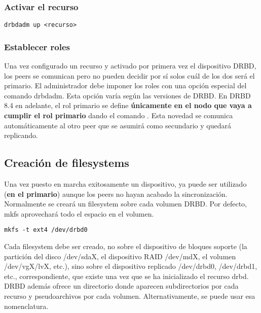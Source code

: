 \subsubsection{Activar el recurso}
\begin{lstlisting}
drbdadm up <recurso>
\end{lstlisting}

\subsubsection{Establecer roles}
Una vez configurado un recurso y activado por primera vez el dispositivo DRBD, los peers se comunican pero no pueden decidir por sí solos  cuál de los dos será el primario. El administrador debe imponer los roles con una opción especial del comando drbdadm. Esta opción varía según las versiones de DRBD. 
En DRBD 8.4 en adelante, el rol primario se define \textbf{únicamente en el nodo que vaya a cumplir el rol primario} dando el comando . Esta novedad se comunica automáticamente al otro peer que se asumirá como secundario y quedará replicando.



\subsection{Creación de filesystems}
Una vez puesto en marcha exitosamente un dispositivo, ya puede ser utilizado (\textbf{en el primario}) aunque los peers no hayan acabado la sincronización. Normalmente se creará un filesystem sobre cada volumen DRBD. Por defecto, mkfs aprovechará todo el espacio en el volumen. 

\begin{lstlisting}
mkfs -t ext4 /dev/drbd0
\end{lstlisting}



 
Cada filesystem debe ser creado, no sobre el dispositivo de bloques soporte (la partición del disco /dev/sdaX, el dispositivo RAID /dev/mdX, el volumen /dev/vgX/lvX, etc.), sino sobre el dispositivo replicado /dev/drbd0, /dev/drbd1, etc., correspondiente, que existe una vez que se ha inicializado el recurso drbd. DRBD además ofrece un directorio  donde aparecen subdirectorios por cada recurso y pseudoarchivos por cada volumen. Alternativamente, se puede usar esa nomenclatura. 

